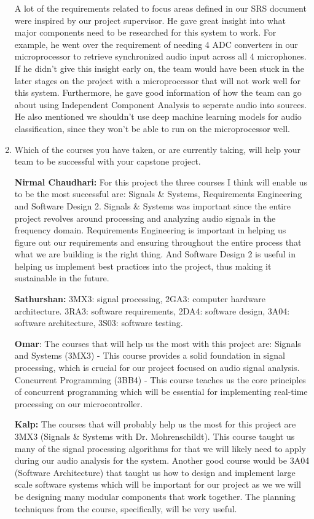 \begin{enumerate}
  A lot of the requirements related to focus areas defined in our SRS document 
  were inspired by our project supervisor. He gave great insight into what major
  components need to be researched for this system to work. For example, he went 
  over the requirement of needing 4 ADC converters in our microprocessor to 
  retrieve synchronized audio input across all 4 microphones. If he didn't give 
  this insight early on, the team would have been stuck in the later stages on 
  the project with a microprocessor that will not work well for this system. 
  Furthermore, he gave good information of how the team can go about using 
  Independent Component Analysis to seperate audio into sources. He also 
  mentioned we shouldn't use deep machine learning models for audio 
  classification, since they won't be able to run on the microprocessor well. 

  
  \item Which of the courses you have taken, or are currently taking, will help
  your team to be successful with your capstone project.

  \textbf{Nirmal Chaudhari: } For this project the three courses I think will 
  enable us to be the most successful are: Signals \& Systems, Requirements 
  Engineering and Software Design 2. Signals \& Systems was important since the 
  entire project revolves around processing and analyzing audio signals in the 
  frequency domain. Requirements Engineering is important in helping us figure 
  out our requirements and ensuring throughout the entire process that what we 
  are building is the right thing. And Software Design 2 is useful in helping 
  us implement best practices into the project, thus making it sustainable 
  in the future.

  \textbf{Sathurshan:} 3MX3: signal processing, 2GA3: computer hardware
  architecture. 3RA3: software requirements, 2DA4: software design,
  3A04: software architecture, 3S03: software testing.

  \textbf{Omar}: The courses that will help us the most with this project are:
  Signals and Systems (3MX3) - This course provides a solid foundation in signal
  processing, which is crucial for our project focused on audio signal analysis.
  Concurrent Programming (3BB4) - This course teaches us the core principles
  of concurrent programming which will be essential for implementing real-time
  processing on our microcontroller.

  \textbf{Kalp:} The courses that will probably help us the most for this 
  project are 3MX3 (Signals & Systems with Dr. Mohrenschildt). This course
  taught us many of the signal processing algorithms for that we will likely 
  need to apply during our audio analysis for the system. Another good course 
  would be 3A04 (Software Architecture) that taught us how to design and 
  implement large scale software systems which will be important for our project
  as we we will be designing many modular components that work together. The 
  planning techniques from the course, specifically, will be very useful.


\end{enumerate}
